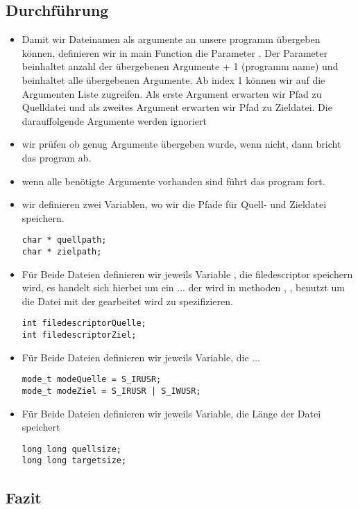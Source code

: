 	\subsection{Durchführung}
	\begin{itemize}
		\item Damit wir Dateinamen als argumente an unsere programm übergeben können, definieren wir in main
		Function die Parameter . Der Parameter
		 beinhaltet anzahl der übergebenen Argumente + 1 (programm name) und
		 beinhaltet alle übergebenen Argumente. Ab index 1 können wir auf die Argumenten Liste
		zugreifen. Als erste Argument erwarten wir Pfad zu Quelldatei und als zweites Argument erwarten wir
	Pfad zu Zieldatei. Die darauffolgende Argumente werden ignoriert
	\item wir prüfen ob genug Argumente übergeben wurde, wenn nicht, dann bricht das program ab.
	\item wenn alle benötigte Argumente vorhanden sind führt das program fort.
	\item wir definieren zwei Variablen, wo wir die Pfade für Quell- und Zieldatei speichern.
	\begin{lstlisting}
char * quellpath;
char * zielpath;
\end{lstlisting}
\item Für Beide Dateien definieren wir jeweils Variable \command{}, die filedescriptor speichern wird,
es handelt sich hierbei um ein ...  der wird in methoden , ,
 benutzt um die Datei mit der gearbeitet wird zu spezifizieren.
	\begin{lstlisting}
int filedescriptorQuelle;
int filedescriptorZiel;
\end{lstlisting}
\item Für Beide Dateien definieren wir jeweils Variable, die ...

\begin{lstlisting}
mode_t modeQuelle = S_IRUSR;
mode_t modeZiel = S_IRUSR | S_IWUSR;
\end{lstlisting}
\item Für Beide Dateien definieren wir jeweils Variable, die Länge der Datei speichert
\begin{lstlisting}
long long quellsize;
long long targetsize;
\end{lstlisting}


\end{itemize} %



	\subsection{Fazit}

\newpage
